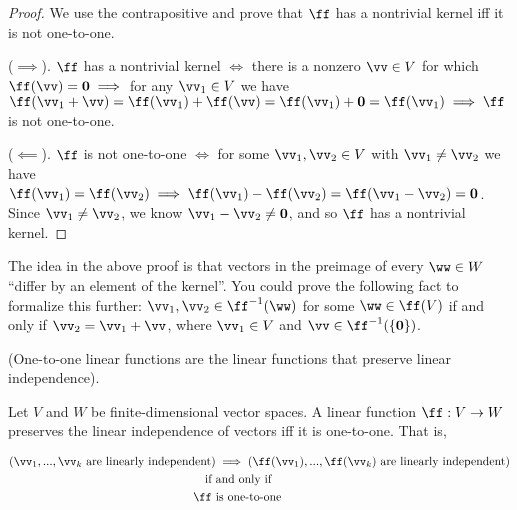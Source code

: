 \begin{proof}
    We use the contrapositive and prove that $\ff$ has a nontrivial kernel iff it is not one-to-one.
    
    ($\implies$). $\ff$ has a nontrivial kernel $\iff$ there is a nonzero $\vv \in V$ for which $\ff(\vv) = \mathbf{0} \implies$ for any $\vv_1 \in V$ we have $\ff(\vv_1 + \vv) = \ff(\vv_1) + \ff(\vv) = \ff(\vv_1) + \mathbf{0} = \ff(\vv_1) \implies \ff$ is not one-to-one.
    
    ($\impliedby$). $\ff$ is not one-to-one $\iff$ for some $\vv_1, \vv_2 \in V$ with $\vv_1 \neq \vv_2$ we have $\ff(\vv_1) = \ff(\vv_2) \implies \ff(\vv_1) - \ff(\vv_2) = \ff(\vv_1 - \vv_2) = \mathbf{0}$. Since $\vv_1 \neq \vv_2$, we know $\vv_1 - \vv_2 \neq \mathbf{0}$, and so $\ff$ has a nontrivial kernel.
\end{proof}

\begin{remark}
    The idea in the above proof is that vectors in the preimage of every $\ww \in W$ ``differ by an element of the kernel''. You could prove the following fact to formalize this further: $\vv_1, \vv_2 \in \ff^{-1}(\ww)$ for some $\ww \in \ff(V)$ if and only if $\vv_2 = \vv_1 + \vv$, where $\vv_1 \in V$ and $\vv \in \ff^{-1}(\{\mathbf{0}\})$.
\end{remark}

\begin{theorem}
\label{ch::lin_alg::lemma::only_inv_fns_preserve_lin_indep}

    (One-to-one linear functions are the linear functions that preserve linear independence). 
    
    Let $V$ and $W$ be finite-dimensional vector spaces. A linear function $\ff:V \rightarrow W$ preserves the linear independence of vectors iff it is one-to-one. That is, 
    
    \begin{align*}
       (\vv_1, ..., \vv_k \text{ are linearly independent}) &\implies (\ff(\vv_1), ..., \ff(\vv_k) \text{ are linearly independent})\\
        \text{if} \text{ } &\text{and only if} \\
        \ff \text{ } &\text{is one-to-one}
    \end{align*}
\end{theorem}

